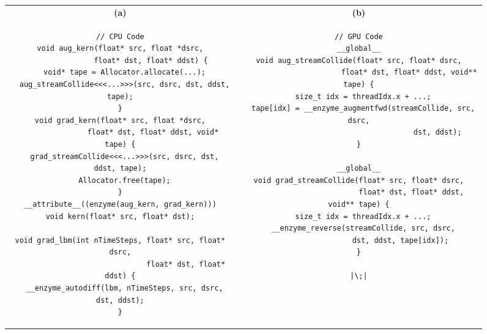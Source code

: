 \begin{figure*}
    \centering
\begin{tabular}{c|c}
\textbf{(a)}&\textbf{(b)}\vspace*{-3mm}
\\
\begin{minipage}[T]{0.48\linewidth}
\begin{verbatim}
// CPU Code
void aug_kern(float* src, float *dsrc,
              float* dst, float* ddst) {
  void* tape = Allocator.allocate(...);
  aug_streamCollide<<<...>>>(src, dsrc, dst, ddst, tape);
}
void grad_kern(float* src, float *dsrc,
               float* dst, float* ddst, void* tape) {
  grad_streamCollide<<<...>>>(src, dsrc, dst, ddst, tape);
  Allocator.free(tape);
}
__attribute__((enzyme(aug_kern, grad_kern)))
void kern(float* src, float* dst);

void grad_lbm(int nTimeSteps, float* src, float* dsrc,
                              float* dst, float* ddst) {
  __enzyme_autodiff(lbm, nTimeSteps, src, dsrc, dst, ddst);
}
\end{verbatim}
\end{minipage}&\begin{minipage}[T]{0.48\linewidth}
\begin{verbatim}
// GPU Code
__global__
void aug_streamCollide(float* src, float* dsrc,
                       float* dst, float* ddst, void** tape) {
  size_t idx = threadIdx.x + ...;
  tape[idx] = __enzyme_augmentfwd(streamCollide, src, dsrc,
                                    dst, ddst);
}

__global__
void grad_streamCollide(float* src, float* dsrc,
                        float* dst, float* ddst, void** tape) {
  size_t idx = threadIdx.x + ...;
  __enzyme_reverse(streamCollide, src, dsrc,
                   dst, ddst, tape[idx]);
}

|\;|
\end{verbatim}
\end{minipage}
\end{tabular}
    \caption{}
    \label{fig:lbm_ad}
\end{figure*}

